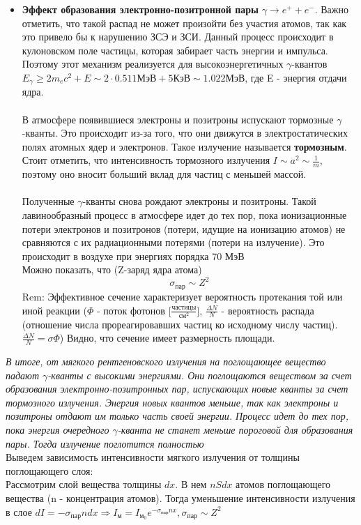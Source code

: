 \documentclass[a4paper,12pt]{article} %
\begin{document}
\begin{itemize}
    \item  \textbf{Эффект образования электронно-позитронной пары} $\gamma \rightarrow e^+ + e^-$. Важно отметить, что такой распад не может произойти без участия атомов, так как это привело бы к нарушению ЗСЭ и ЗСИ. Данный процесс происходит в кулоновском поле частицы, которая забирает часть энергии и импульса. Поэтому этот механизм реализуется для высокоэнергетичных $\gamma$-квантов $E_\gamma \geqslant
2m_ec^2 + E \sim 2\cdot 0.511\text{МэВ} + 5 \text{КэВ} \sim 1.022\text{МэВ}$, где E - энергия отдачи ядра.\\\\
В атмосфере появившиеся электроны и позитроны испускают тормозные $\gamma$-кванты. Это происходит из-за того, что они движутся в электростатических полях атомных ядер и электронов. Такое излучение называется \textbf{тормозным}. Стоит отметить, что интенсивность тормозного излучения $I \sim a^2 \sim \frac{1}{m}$, поэтому оно вносит больший вклад для частиц с меньшей массой. \\\\
Полученные $\gamma$-кванты снова рождают электроны и позитроны. Такой лавинообразный процесс в атмосфере идет до тех пор, пока ионизационные потери электронов и позитронов (потери, идущие на ионизацию атомов) не сравняются с их радиационными потерями (потери на излучение). Это происходит в воздухе при энергиях порядка 70 МэВ
\\
Можно показать, что (Z-заряд ядра атома)
\begin{equation*}
    \sigma_{\text{пар}}\sim Z^2
\end{equation*}
Rem: Эффективное сечение характеризует вероятность протекания той или иной реакции ($\Phi$ - поток фотонов [$\frac{\text{частицы}}{\text{см}^2}$], $\frac{\Delta N}{N}$ - вероятность распада (отношение числа прореагировавших частиц ко исходному числу частиц). 
$\frac{\Delta N}{N} = \sigma \Phi$)
Видно, что сечение имеет размерность площади. 

\end{itemize}

\textit{
В итоге, от мягкого рентгеновского излучения на поглощающее вещество падают $\gamma$-кванты с высокими энергиями. Они поглощаются веществом за счет образования электронно-позитронных пар, испускающих новые кванты за счет тормозного излучения. Энергия новых квантов меньше, так как электроны и позитроны отдают им только часть своей энергии. Процесс идет до тех пор, пока энергия очередного $\gamma$-кванта не станет меньше пороговой для образования пары. Тогда излучение поглотится полностью}\\
Выведем зависимость интенсивности мягкого излучения от толщины поглощающего слоя:\\
Рассмотрим слой вещества толщины $dx$. В нем $nSdx$ атомов поглощающего вещества (n - концентрация атомов). Тогда уменьшение интенсивности излучения в слое $dI = -\sigma_{\text{пар}}n dx \Rightarrow \boxed{I_{\text{м}} = I_{\text{м}_0} e^{-\sigma_{\text{пар}}nx}, \sigma_{\text{пар}} \sim Z^2} $
\end{document}
